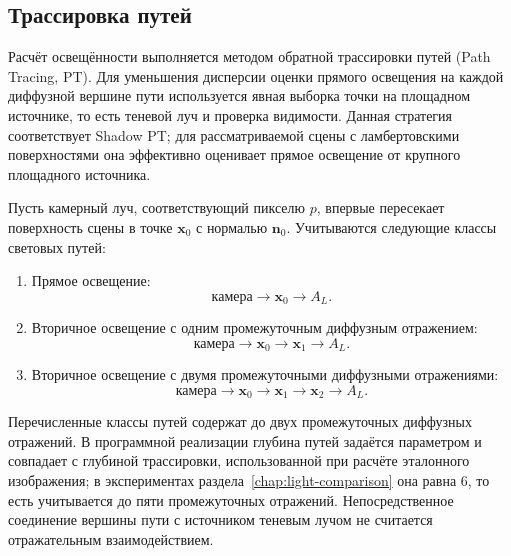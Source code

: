 \subsection{Трассировка путей}

Расчёт освещённости выполняется методом обратной трассировки путей (Path Tracing, PT). Для уменьшения дисперсии оценки прямого освещения на каждой диффузной вершине пути используется явная выборка точки на площадном источнике, то есть теневой луч и проверка видимости. Данная стратегия соответствует Shadow PT; для рассматриваемой сцены с ламбертовскими поверхностями она эффективно оценивает прямое освещение от крупного площадного источника.

Пусть камерный луч, соответствующий пикселю $p$, впервые пересекает поверхность сцены в точке $\mathbf{x}_0$ с нормалью $\mathbf{n}_0$. Учитываются следующие классы световых путей:
\begin{enumerate}
    \item Прямое освещение:
    \begin{equation}
    \text{камера}
    \rightarrow
    \mathbf{x}_0
    \rightarrow
    A_L.
    \end{equation}

    \item Вторичное освещение с одним промежуточным диффузным отражением:
    \begin{equation}
    \text{камера}
    \rightarrow
    \mathbf{x}_0
    \rightarrow
    \mathbf{x}_1
    \rightarrow
    A_L.
    \end{equation}

    \item Вторичное освещение с двумя промежуточными диффузными отражениями:
    \begin{equation}
    \text{камера}
    \rightarrow
    \mathbf{x}_0
    \rightarrow
    \mathbf{x}_1
    \rightarrow
    \mathbf{x}_2
    \rightarrow
    A_L.
    \end{equation}
\end{enumerate}

Перечисленные классы путей содержат до двух промежуточных диффузных отражений. В программной реализации глубина путей задаётся параметром и совпадает с глубиной трассировки, использованной при расчёте эталонного изображения; в экспериментах раздела~\ref{chap:light-comparison} она равна 6, то есть учитывается до пяти промежуточных отражений. Непосредственное соединение вершины пути с источником теневым лучом не считается отражательным взаимодействием.

